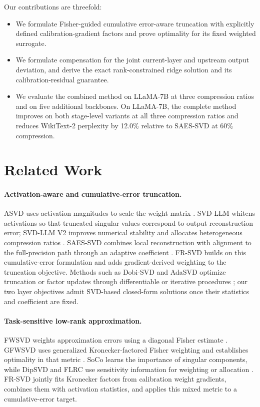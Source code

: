 \documentclass[11pt]{article}
\begin{document}
Our contributions are threefold:
\begin{itemize}
\item We formulate Fisher-guided cumulative error-aware truncation with explicitly defined calibration-gradient factors and prove optimality for its fixed weighted surrogate.
\item We formulate compensation for the joint current-layer and upstream output deviation, and derive the exact rank-constrained ridge solution and its calibration-residual guarantee.
\item We evaluate the combined method on LLaMA-7B at three compression ratios and on five additional backbones. On LLaMA-7B, the complete method improves on both stage-level variants at all three compression ratios and reduces WikiText-2 perplexity by 12.0\% relative to SAES-SVD at 60\% compression.
\end{itemize}

\section{Related Work}\label{sec:related-work}

\paragraph{Activation-aware and cumulative-error truncation.}
ASVD uses activation magnitudes to scale the weight matrix \citep{yuan2023asvd}. SVD-LLM whitens activations so that truncated singular values correspond to output reconstruction error; SVD-LLM V2 improves numerical stability and allocates heterogeneous compression ratios \citep{wang2025svdllm,wang2025svdllmv2}. SAES-SVD combines local reconstruction with alignment to the full-precision path through an adaptive coefficient \citep{hu2026saessvd}. FR-SVD builds on this cumulative-error formulation and adds gradient-derived weighting to the truncation objective. Methods such as Dobi-SVD and AdaSVD optimize truncation or factor updates through differentiable or iterative procedures \citep{wang2025dobisvd,li2025adasvd}; our two layer objectives admit SVD-based closed-form solutions once their statistics and coefficient are fixed.

\paragraph{Task-sensitive low-rank approximation.}
FWSVD weights approximation errors using a diagonal Fisher estimate \citep{hsu2022fwsvd}. GFWSVD uses generalized Kronecker-factored Fisher weighting and establishes optimality in that metric \citep{chekalina2025gfwsvd}. SoCo learns the importance of singular components, while DipSVD and FLRC use sensitivity information for weighting or allocation \citep{li2025soco,ding2025dipsvd,lu2025flrc}. FR-SVD jointly fits Kronecker factors from calibration weight gradients, combines them with activation statistics, and applies this mixed metric to a cumulative-error target.
\end{document}
